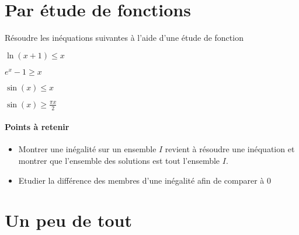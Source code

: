 \documentclass[a4paper, 11pt]{article}
\newcommand{\subscript}[2]{$#1 _ #2$}
\begin{document}
\section{Par étude de fonctions}
\begin{exercice}

Résoudre les inéquations suivantes à l'aide d'une étude de fonction 
\vspace{0.4cm}
    \begin{enumerate}[label=(\subscript{I}{{\arabic*}}) : $\,$]
\hspace{1cm}
\begin{minipage}{0.4\textwidth}
        \item $ \ln(x+1)\leq x$\\
        \item $ e^{x}-1 \geq x$
    \end{minipage}
    \begin{minipage}{0.4\textwidth}
        \item $ \sin(x)\leq x$\\
        \item $ \sin(x)\geq \frac{\pi x}{2}$
    \end{minipage}
\end{enumerate}
\end{exercice}


\paragraph{Points à retenir}
\begin{itemize}
    \item Montrer une inégalité sur un ensemble $I$ revient à résoudre une inéquation et montrer que l'ensemble des solutions est tout l'ensemble $I$.
    \item Etudier la différence des membres d'une inégalité afin de comparer à $0$
\end{itemize}


\section{Un peu de tout}
\end{document}
